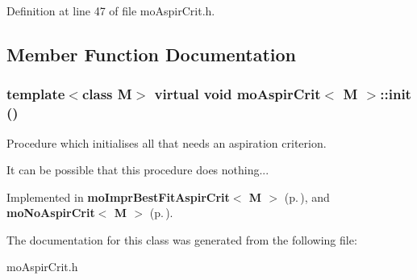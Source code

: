 Definition at line 47 of file mo\-Aspir\-Crit.h.

\subsection{Member Function Documentation}
\subsubsection{\setlength{\rightskip}{0pt plus 5cm}template$<$class M$>$ virtual void {\bf mo\-Aspir\-Crit}$<$ M $>$::init ()\hspace{0.3cm}{\tt  [pure virtual]}}\label{classmo_aspir_crit_a0}


Procedure which initialises all that needs an aspiration criterion. 

It can be possible that this procedure does nothing... 

Implemented in {\bf mo\-Impr\-Best\-Fit\-Aspir\-Crit$<$ M $>$} {\rm (p.\,\pageref{classmo_impr_best_fit_aspir_crit_a1})}, and {\bf mo\-No\-Aspir\-Crit$<$ M $>$} {\rm (p.\,\pageref{classmo_no_aspir_crit_a1})}.

The documentation for this class was generated from the following file:\begin{CompactItemize}
\item 
mo\-Aspir\-Crit.h\end{CompactItemize}
